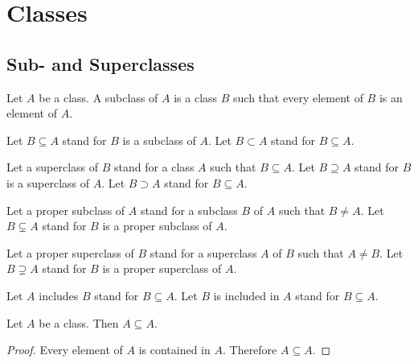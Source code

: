 \documentclass[10pt]{article}
\begin{document}
  \begin{imports}
    \begin{forthel}
    \end{forthel}
  \end{imports}


  \section*{Classes}

  \subsection*{Sub- and Superclasses}

  \begin{forthel}
    \begin{definition}[id=FOUNDATIONS_01_3275578358628352,printid]
      Let $A$ be a class.
      A subclass of $A$ is a class $B$ such that every element of $B$ is an
      element of $A$.
    \end{definition}

    Let $B \subseteq A$ stand for $B$ is a subclass of $A$.
    Let $B \subset A$ stand for $B \subseteq A$.

    Let a superclass of $B$ stand for a class $A$ such that $B \subseteq A$.
    Let $B \supseteq A$ stand for $B$ is a superclass of $A$.
    Let $B \supset A$ stand for $B \subseteq A$.

    Let a proper subclass of $A$ stand for a subclass $B$ of $A$ such that $B \neq A$.
    Let $B \subsetneq A$ stand for $B$ is a proper subclass of $A$.

    Let a proper superclass of $B$ stand for a superclass $A$ of $B$ such that $A \neq B$.
    Let $B \supsetneq A$ stand for $B$ is a proper superclass of $A$.

    Let $A$ includes $B$ stand for $B \subseteq A$.
    Let $B$ is included in $A$ stand for $B \subseteq A$.
  \end{forthel}

  \begin{forthel}
    \begin{proposition}[id=FOUNDATIONS_01_5994555614691328,printid]
      Let $A$ be a class.
      Then $A \subseteq A$.
    \end{proposition}
    \begin{proof}
      Every element of $A$ is contained in $A$.
      Therefore $A \subseteq A$.
    \end{proof}
  \end{forthel}
\end{document}
